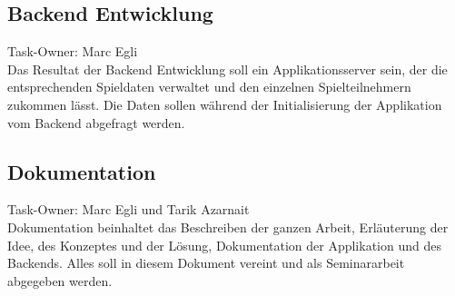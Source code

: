\subsection{Backend Entwicklung} %
\label{sub:backend_entwicklung}
Task-Owner: Marc Egli\\
Das Resultat der Backend Entwicklung soll ein Applikationsserver sein, der die entsprechenden Spieldaten verwaltet und den einzelnen Spielteilnehmern zukommen lässt. Die Daten sollen während der Initialisierung der Applikation vom Backend abgefragt werden.

\subsection{Dokumentation} %
\label{sub:dokumentation}
Task-Owner: Marc Egli und Tarik Azarnait\\
Dokumentation beinhaltet das Beschreiben der ganzen Arbeit, Erläuterung der Idee, des Konzeptes und der Lösung, Dokumentation der Applikation und des Backends. Alles soll in diesem Dokument vereint und als Seminararbeit abgegeben werden. 

